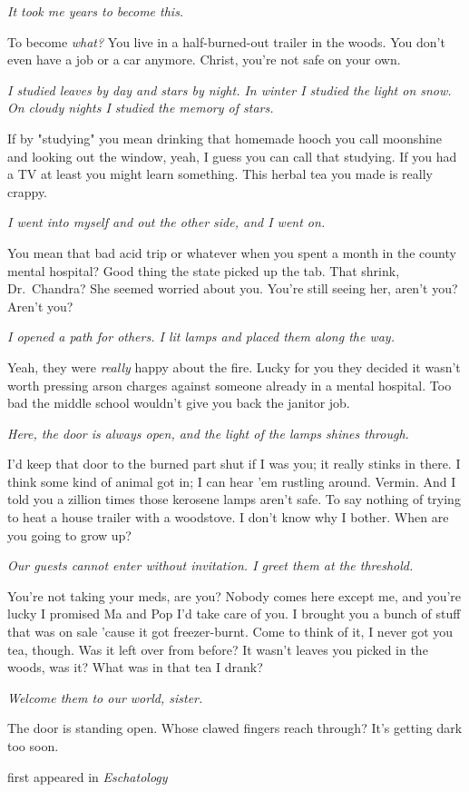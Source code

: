
\emph{It took me years to become this.}

To become \emph{what?} You live in a half-burned-out trailer in the
woods. You don't even have a job or a car anymore. Christ, you're not
safe on your own.

\emph{I studied leaves by day and stars by night. In winter I studied
the light on snow. On cloudy nights I studied the memory of stars.}

If by "studying" you mean drinking that homemade hooch you call
moonshine and looking out the window, yeah, I guess you can call that
studying. If you had a TV at least you might learn something. This
herbal tea you made is really crappy.

\emph{I went into myself and out the other side, and I went on.}

You mean that bad acid trip or whatever when you spent a month in the
county mental hospital? Good thing the state picked up the tab. That
shrink, Dr.~Chandra? She seemed worried about you. You're still seeing
her, aren't you? Aren't you?

\emph{I opened a path for others. I lit lamps and placed them along the
way.}

Yeah, they were \emph{really} happy about the fire. Lucky for you they
decided it wasn't worth pressing arson charges against someone already
in a mental hospital. Too bad the middle school wouldn't give you back
the janitor job.

\emph{Here, the door is always open, and the light of the lamps shines
through.}

I'd keep that door to the burned part shut if I was you; it really
stinks in there. I think some kind of animal got in; I can hear 'em
rustling around. Vermin. And I told you a zillion times those kerosene
lamps aren't safe. To say nothing of trying to heat a house trailer with
a woodstove. I don't know why I bother. When are you going to grow up?

\emph{Our guests cannot enter without invitation. I greet them at the
threshold.}

You're not taking your meds, are you? Nobody comes here except me, and
you're lucky I promised Ma and Pop I'd take care of you. I brought you a
bunch of stuff that was on sale 'cause it got freezer-burnt. Come to
think of it, I never got you tea, though. Was it left over from before?
It wasn't leaves you picked in the woods, was it? What was in that tea I
drank?

\emph{Welcome them to our world, sister.}

The door is standing open. Whose clawed fingers reach through? It's
getting dark too soon.

first appeared in \emph{Eschatology}
